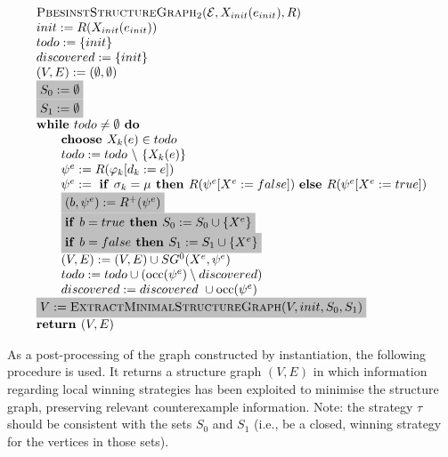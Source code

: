 \documentclass{article}
\newcommand{\Space}{\text{\ }}
\newcommand{\If}{\text{\textbf{if }}}
\newcommand{\Do}{\text{\textbf{ do }}}
\newcommand{\Then}{\text{\textbf{ then }}}
\newcommand{\Else}{\text{\textbf{else }}}
\newcommand{\While}{\text{\textbf{while }}}
\newcommand{\Choose}{\text{\textbf{choose }}}
\newcommand{\Return}{\text{\textbf{return }}}
\begin{document}
\begin{equation*}
\begin{array}{l}
\textsc{PbesinstStructureGraph$_2$}(\mathcal{E}, X_{init}(e_{init}), R) \\ 
init:=R(X_{init}(e_{init})) \\
todo:=\{init\} \\
discovered:=\{init\} \\
(V,E) :=(\emptyset ,\emptyset ) \\ 
\colorbox{lightgray}{$%
S_0:= \emptyset $}\\
\colorbox{lightgray}{$%
S_1:= \emptyset $}\\
\While todo\neq \emptyset \Do \\ 
\qquad \Choose X_{k}(e)\in todo \\ 
\qquad todo:=todo\ \backslash \ \{X_{k}(e)\} \\ 
\qquad \psi ^{e}:=R(\varphi _{k}[d_{k}:=e]) \\ 
\qquad \psi^e := \Space \If \sigma_k = \mu \Then R(\psi^e[X^e := false])
\Space \Else R(\psi^e[X^e := true]) \\
\qquad \colorbox{lightgray}{$%
(b,\psi^e) := R^+(\psi^e) $}\\
\qquad \colorbox{lightgray}{$%
\If b = true \Then S_0 := S_0 \cup \{ X^e \} $}\\
\qquad \colorbox{lightgray}{$%
\If b = false \Then S_1 := S_1 \cup \{ X^e \} $}\\
\qquad (V,E) := (V,E) \cup SG^{0}(X^{e},\psi ^{e}) \\ 
\qquad todo:=todo\cup (\mathrm{occ}(\psi ^{e})\setminus discovered) \\
\qquad discovered:=discovered\ \cup \mathrm{occ}(\psi ^{e}) \\
\colorbox{lightgray}{$V := \textsc{ExtractMinimalStructureGraph}(V, init, S_0, S_1)$} \\
\Return (V, E)
\end{array}%
\end{equation*}%

As a post-processing of the graph constructed by instantiation, the following procedure is used.
It returns a structure graph $(V,E)$ in which information regarding local winning strategies has been exploited to minimise the structure graph, preserving relevant counterexample information. Note: the strategy $\tau$ should be consistent with the sets $S_0$ and $S_1$ (i.e., be a closed, winning strategy for the vertices in those sets).
\end{document}
